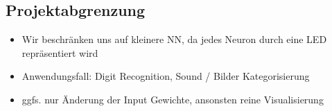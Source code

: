 \subsection{Projektabgrenzung} 
\label{sec:Projektabgrenzung}
\begin{itemize}
	\item Wir beschr\"anken uns auf kleinere NN, da jedes Neuron durch eine LED repr\"asentiert wird
	\item Anwendungsfall: Digit Recognition, Sound / Bilder Kategorisierung
	\item ggfs. nur \"Anderung der Input Gewichte, ansonsten reine Visualisierung 
\end{itemize}
